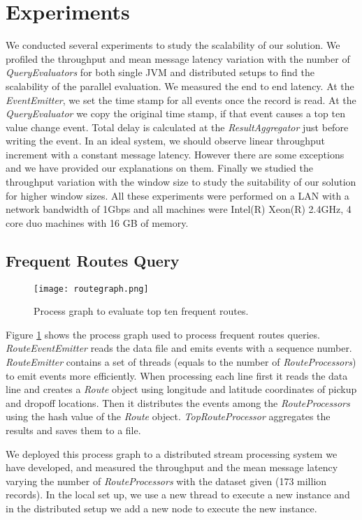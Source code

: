 \section{Experiments}
We conducted several experiments to study the scalability of our solution. We profiled the throughput and mean message latency variation with the number of \textit{QueryEvaluators} for both single JVM and distributed setups to find the scalability of the parallel evaluation. We measured the end to end latency. At the \textit{EventEmitter}, we set the time stamp for all events once the record is read. At the \textit{QueryEvaluator} we copy the original time stamp, if that event causes a top ten value change event. Total delay is calculated at the \textit{ResultAggregator} just before writing the event. In an ideal system, we should observe linear throughput increment with a constant message latency. However there are some exceptions and we have provided our explanations on them. Finally we studied the throughput variation with the window size to study the suitability of our solution for higher window sizes. All these experiments were performed on a LAN with a network bandwidth of 1Gbps and all machines were Intel(R) Xeon(R) 2.4GHz, 4 core duo machines with 16 GB of memory. 

\subsection{Frequent Routes Query}

\begin{figure}[!t]
        \centering
        \texttt{[image: routegraph.png]}
        \caption{Process graph to evaluate top ten frequent routes.}
        \label{routegraph}
\end{figure}

Figure \ref{routegraph} shows the process graph used to process frequent routes queries. \textit{RouteEventEmitter} reads the data file and emits events with a sequence number. \textit{RouteEmitter} contains a set of threads (equals to the number of \textit{RouteProcessors}) to emit events more efficiently. When processing each line first it reads the data line and creates a \textit{Route} object using longitude and latitude coordinates of pickup and dropoff locations. Then it distributes the events among the \textit{RouteProcessors} using the hash value of the \textit{Route} object. \textit{TopRouteProcessor} aggregates the results and saves them to a file.

We deployed this process graph to a distributed stream processing system we have developed, and  measured the throughput and the mean message latency varying the number of \textit{RouteProcessors} with the dataset given (173 million records). In the local set up, we use a new thread to execute a new instance and in the distributed setup we add a new node to execute the new instance.

